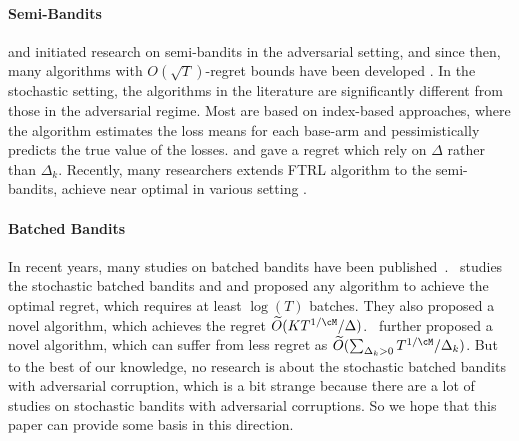 \paragraph{Semi-Bandits}
\cite{gyorgy2007line} and \cite{gai2012combinatorial} initiated research on semi-bandits in the adversarial setting, and since then, many algorithms with $O(\sqrt{T})$-regret bounds have been developed
\cite{neu2013efficient,audibert2014regret,neu2015first,wei2018more}.
In the stochastic setting, the algorithms in the literature are significantly different from those in the adversarial regime. Most are based on index-based approaches, where the algorithm estimates the loss means for each base-arm and pessimistically predicts the true value of the losses. \cite{kveton2015tight} and \cite{wang2018thompson} gave a regret which rely on $\Delta$ rather than $\Delta_k$. Recently, many researchers extends FTRL algorithm to the semi-bandits, achieve near optimal in various setting \cite{wei2018more,zimmert2019beating,ito2021hybrid,tsuchiya2023further}.

\paragraph{Batched Bandits}
In recent years, many studies on batched bandits have been published~\citep{Perchet_2016,agarwal2017learning,gao2019batched,han2020sequential,jin2021double,ruan2021linear,esfandiari2021regret,feng2022lipschitz}.~\cite{gao2019batched} studies the stochastic
batched bandits and and proposed any algorithm to achieve the optimal regret, which requires at least $\log(T)$ batches. They also proposed a novel algorithm, which achieves the regret $\widetilde{O}(K T^{1/\cM} / \Delta)$.~\cite{esfandiari2021regret} further proposed a novel algorithm, which can suffer from less regret as $\widetilde{O}(\sum_{\Delta_k > 0}T^{1/\cM} / \Delta_k)$. But to the best of our knowledge, no research is about the stochastic batched bandits with adversarial corruption, which is a bit strange because there are a lot of studies on stochastic bandits with adversarial corruptions. So we hope that this paper can provide some basis in this direction.

